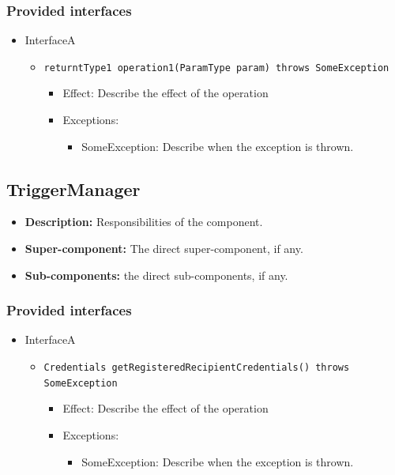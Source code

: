 \documentclass[a4paper,10pt]{article}
\begin{document}
\subsubsection*{Provided interfaces}
\begin{itemize}
    \item InterfaceA
    \begin{itemize}
        \item \texttt{returntType1 operation1(ParamType param) throws SomeException}
        \begin{itemize}
            \item Effect: Describe the effect of the operation
            \item Exceptions:
            \begin{itemize}
                \item SomeException: Describe when the exception is thrown.
            \end{itemize}
        \end{itemize}
    \end{itemize}
\end{itemize}

\subsection{TriggerManager}
\begin{itemize}
    \item \textbf{Description:} Responsibilities of the component.
    \item \textbf{Super-component:} The direct super-component, if any.
    \item \textbf{Sub-components:} the direct sub-components, if any.
\end{itemize}

\subsubsection*{Provided interfaces}
\begin{itemize}
    \item InterfaceA
    \begin{itemize}
        \item \texttt{Credentials getRegisteredRecipientCredentials() throws SomeException}
        \begin{itemize}
            \item Effect: Describe the effect of the operation
            \item Exceptions:
            \begin{itemize}
                \item SomeException: Describe when the exception is thrown.
            \end{itemize}
		\end{itemize}
    \end{itemize}
\end{itemize}
\end{document}
